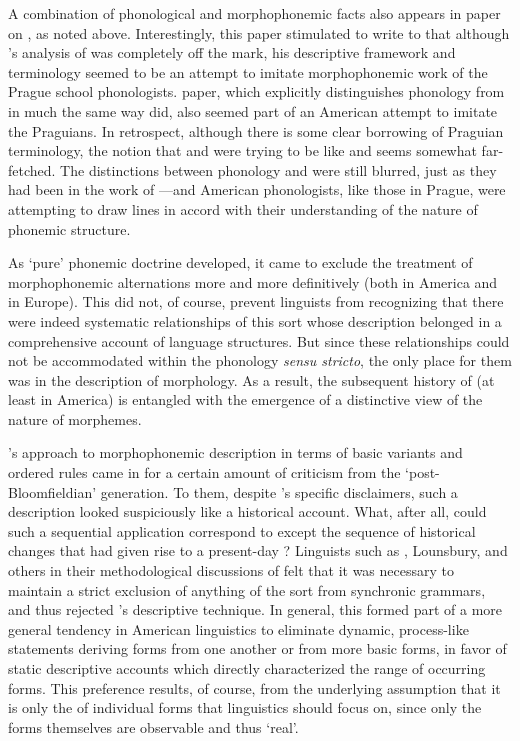 A combination of phonological and morphophonemic facts also appears in
 paper on , as noted
above. Interestingly, this paper stimulated {\Trubetzkoy} to write to
{\Jakobson} that although {\Trager}'s analysis of  was completely off
the mark, his descriptive framework and terminology seemed to be an
attempt to imitate morphophonemic work of the Prague school
phonologists.  paper, which explicitly
distinguishes phonology from  in much the same way
{\Trubetzkoy} did, also seemed part of an American attempt to imitate the
Praguians. In retrospect, although there is some clear borrowing of
Praguian terminology, the notion that {\Trager} and {\Swadesh} were trying
to be like {\Trubetzkoy} and {\Jakobson} seems somewhat far-fetched. The
distinctions between phonology and  were still blurred,
just as they had been in the work of {\DeCourtenay}—and
American phonologists, like those in Prague, were attempting to draw
lines in accord with their understanding of the nature of phonemic
structure.

As `pure' phonemic doctrine developed, it came to exclude the
treatment of morphophonemic alternations more and more definitively
(both in America and in Europe). This did not, of course, prevent
linguists from recognizing that there were indeed systematic
relationships of this sort whose description belonged in a
comprehensive account of language structures. But since these
relationships could not be accommodated within the phonology
\emph{sensu stricto}, the only place for them was in the description
of morphology. As a result, the subsequent history of 
(at least in America) is entangled with the emergence of a distinctive
view of the nature of morphemes.

{\Bloomfield}'s approach to morphophonemic description in terms of basic
variants and ordered rules came in for a certain amount of criticism
from the `post-Bloomfieldian' generation. To them, despite
{\Bloomfield}'s specific disclaimers, such a description looked
suspiciously like a historical account. What, after all, could such a
sequential application correspond to except the sequence of historical
changes that had given rise to a present-day ? Linguists
such as {\Wells}, Lounsbury, and others in their methodological
discussions of  felt that it was necessary to maintain
a strict exclusion of anything of the sort from synchronic grammars,
and thus rejected {\Bloomfield}'s descriptive technique. In general, this
formed part of a more general tendency in American linguistics to
eliminate dynamic, process-like statements deriving forms from one
another or from more basic forms, in favor of static descriptive
accounts which directly characterized the range of occurring
forms. This preference results, of course, from the underlying
assumption that it is only the  of individual forms
that linguistics should focus on, since only the forms themselves are
observable and thus `real'.

